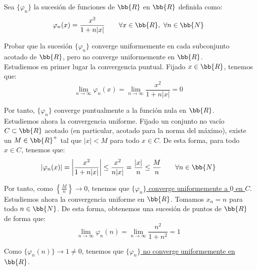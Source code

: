\begin{ejercicio}
    Sea $\{\varphi_n\}$ la sucesión de funciones de $\bb{R}$ en $\bb{R}$ definida como:
    \begin{equation*}
        \varphi_n(x) = \frac{x^2}{1+n|x|} \qquad \forall x\in \bb{R},~\forall n\in \bb{N}
    \end{equation*}

    Probar que la sucesión $\{\varphi_n\}$ converge uniformemente en cada subconjunto acotado de $\bb{R}$, pero no converge uniformemente en $\bb{R}$.\\

    Estudiemos en primer lugar la convergencia puntual. Fijado $x\in \bb{R}$, tenemos que:
    \begin{equation*}
        \lim_{n\to \infty} \varphi_n(x) = \lim_{n\to \infty} \frac{x^2}{1+n|x|} = 0
    \end{equation*}

    Por tanto, $\{\varphi_n\}$ converge puntualmente a la función nula en $\bb{R}$.\\

    Estudiemos ahora la convergencia uniforme. Fijado un conjunto no vacío $C\subset \bb{R}$ acotado (en particular, acotado para la norma del máximo), existe un $M\in \bb{R}^+$ tal que $|x|<M$ para todo $x\in C$. De esta forma, para todo $x\in C$, tenemos que:
    \begin{equation*}
        |\varphi_n(x)| = \left|\frac{x^2}{1+n|x|}\right| \leq \frac{x^2}{n|x|} = \frac{|x|}{n} \leq \frac{M}{n} \qquad \forall n\in \bb{N}
    \end{equation*}

    Por tanto, como $\left\{\frac{M}{n}\right\}\to 0$, tenemos que \ul{$\{\varphi_n\}$ converge uniformemente a $0$ en $C$}.\\

    Estudiemos ahora la convergencia uniforme en $\bb{R}$. Tomamos $x_n=n$ para todo $n\in \bb{N}$. De esta forma, obtenemos una sucesión de puntos de $\bb{R}$ de forma que:
    \begin{equation*}
        \lim_{n\to \infty} \varphi_n(n) = \lim_{n\to \infty} \frac{n^2}{1+n^2} = 1
    \end{equation*}

    Como $\{\varphi_n(n)\}\to 1\neq 0$, tenemos que \ul{$\{\varphi_n\}$ no converge uniformemente en $\bb{R}$}.
\end{ejercicio}


